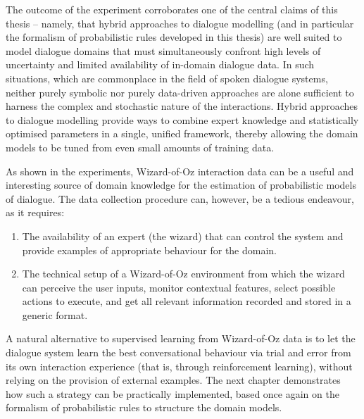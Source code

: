The outcome of the experiment corroborates one of the central claims of this thesis -- namely, that hybrid approaches to dialogue modelling (and in particular the formalism of probabilistic rules developed in this thesis) are well suited to model dialogue domains that must simultaneously confront high levels of uncertainty and limited availability of in-domain dialogue data. In such situations, which are commonplace in the field of spoken dialogue systems, neither purely symbolic nor purely data-driven approaches are alone sufficient to harness the complex and stochastic nature of the interactions.  Hybrid approaches to dialogue modelling provide ways to combine expert knowledge and statistically optimised parameters in a single, unified framework, thereby allowing the domain models to be tuned from even small amounts of training data. 

As shown in the experiments, Wizard-of-Oz interaction data can be a useful and interesting source of domain knowledge for the estimation of probabilistic models of dialogue. The data collection procedure can, however, be a tedious endeavour, as it requires:
\begin{enumerate}
\item The availability of an expert (the wizard) that can control the system and provide examples of appropriate behaviour for the domain.
\item The technical setup of a Wizard-of-Oz environment from which the wizard can perceive the user inputs, monitor contextual features, select possible actions to execute, and get all relevant information recorded and stored in a generic format. 
\end{enumerate}

A natural alternative to supervised learning from Wizard-of-Oz data is to let the dialogue system learn the best conversational behaviour via trial and error from its own interaction experience (that is, through reinforcement learning), without relying on the provision of external examples.  The next chapter demonstrates how such a strategy can be practically implemented, based once again on the formalism of probabilistic rules to structure the domain models. 
